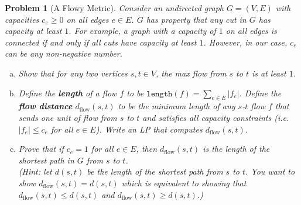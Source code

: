 \documentclass[10pt]{article}
\newtheorem{problem}{\sc\color{cit}Problem}
\begin{document}
\begin{problem}[A Flowy Metric]
Consider an undirected graph $G = (V, E)$ with capacities $c_e\ge 0$ on all edges $e \in E$. $G$ has property that any cut in $G$ has capacity at least $1$. For example, a graph with a capacity of $1$ on all edges is connected if and only if all cuts have capacity at least $1$. However, in our case, $c_e$ can be any non-negative number.
\begin{enumerate}[(a)]
    \item Show that for any two vertices $s, t \in V$, the max flow from $s$ to $t$ is at least $1$.
    \item Define the \textbf{length} of a flow $f$ to be $\texttt{length}(f) = \sum_{e\in E} |f_e|$. Define the \textbf{flow distance} $d_{\text{flow}} (s,t)$ to be the minimum length of any $s$-$t$ flow $f$ that sends one unit of flow from $s$ to $t$ and satisfies all capacity constraints (i.e. $|f_e|\le c_e$ for all $e \in E$). Write an LP that computes $d_{\text{flow}} (s,t)$. 
    \item Prove that if $c_e = 1$ for all $e\in E$, then $d_{\text{flow}} (s,t)$ is the length of the shortest path in $G$ from $s$ to $t$. \\
    (Hint: let $d(s,t)$ be the length of the shortest path from $s$ to $t$. You want to show $d_{\text{flow}} (s,t) = d(s,t)$ which is equivalent to showing that $d_{\text{flow}} (s,t) \le d(s,t)$ and $d_{\text{flow}} (s,t) \ge d(s,t)$.)
\end{enumerate}
\end{problem}
\end{document}
